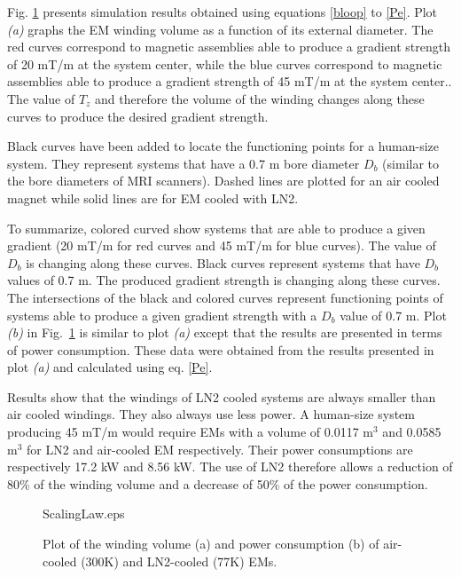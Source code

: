 Fig. \ref{fig:ScalingLaw} presents simulation results obtained using equations \ref{bloop} to \ref{Pe}. Plot \emph{(a)} graphs the EM winding volume as a function of its external diameter. The red curves correspond to magnetic assemblies able to produce a gradient strength of 20 mT/m at the system center, while the blue curves correspond to magnetic assemblies  able to produce a gradient strength of 45 mT/m at the system center.. The value of $T_z$ and therefore the volume of the winding changes along these curves to produce the desired gradient strength.

Black curves have been added to locate the functioning points for a human-size system. They represent systems that have a 0.7 m bore diameter $D_b$ (similar to the bore diameters of MRI scanners). Dashed lines are plotted for an air cooled magnet while solid lines are for EM cooled with LN2.



To summarize, colored curved show systems that are able to produce a given gradient (20 mT/m for red curves and 45 mT/m for blue curves). 
 The value of $D_b$ is changing along these curves. Black curves represent systems that have $D_b$ values of 0.7 m. 
 The produced gradient strength is changing along these curves. 
  The intersections of the black and colored curves represent functioning points of systems able to produce a given gradient strength with a $D_b$ value of 0.7 m.
Plot \emph{(b)} in Fig.~\ref{fig:ScalingLaw} is similar to plot \emph{(a)} except that the results are presented in terms of power consumption. These data were obtained from the results presented in plot \emph{(a)} and calculated using eq. \ref{Pe}.

Results show that the windings of LN2 cooled systems are always smaller than air cooled windings. They also always use less power. A human-size system producing 45 mT/m would require EMs with a volume of 0.0117 m$^3$ and 0.0585 m$^3$ for LN2 and air-cooled EM respectively. Their power consumptions are respectively 17.2 kW and 8.56 kW. The use of LN2 therefore allows a reduction of 80\% of the winding volume and a decrease of 50\% of the power consumption.




\begin{figure}
	\centering
	\begin{overpic}[width=0.5\columnwidth]{ScalingLaw.eps}
	\end{overpic}
	\caption{Plot of the winding volume (a) and power consumption (b) of air-cooled (300K) and LN2-cooled (77K) EMs.}
	\label{fig:ScalingLaw}
\end{figure}



